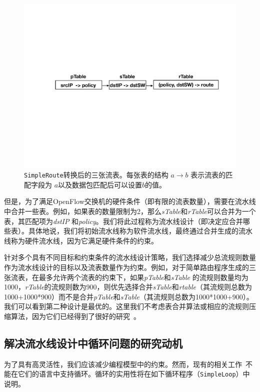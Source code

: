 \vspace{0.5cm}
\begin{figure}[!htbp]
\includegraphics[width=0.8\linewidth]{figures/lp-65.pdf}
\centering
\caption{\small \texttt{SimpleRoute}转换后的三张流表。每张表的结构 $a \rightarrow b$ 表示流表的匹配字段为 $a$以及数据包匹配后可以设置$b$的值。}
\label{fig:srp}
\end{figure}

但是，为了满足OpenFlow交换机的硬件条件（即有限的流表数量），需要在流水线中合并一些表。例如，如果表的数量限制为2，那么\emph{sTable}和\emph{rTable}可以合并为一个表，其匹配项为\emph{dstIP} 和\emph{policy}。我们将此过程称为流水线设计（即决定应合并哪些表）。具体地说，我们将初始流水线称为软件流水线，最终通过合并生成的流水线称为硬件流水线，因为它满足硬件条件的约束。

针对多个具有不同目标和约束条件的流水线设计策略，我们选择减少总流规则数量作为流水线设计的目标以及流表数量作为约束。例如，对于简单路由程序生成的三张流表，在最多允许两个流表的约束下，如果\emph{pTable}和\emph{sTable} 的流规则数量均为1000，\emph{rTable}的流规则数为900，则优先选择合并\emph{sTable}和\emph{rtable}（其流规则总数为1000+1000*900）而不是合并\emph{pTable}和\emph{sTable}（其流规则总数为1000*1000+900）。我们可以看到第二种设计是最优的。这里我们不考虑表合并算法或相应的流规则压缩算法，因为它们已经得到了很好的研究~\cite{ge2015h,gupta2001algorithms}。

\subsection{解决流水线设计中循环问题的研究动机}
为了具有高灵活性，我们应该减少编程模型中的约束。然而，现有的相关工作~\cite{snap,sivaraman2016packet}不能在它们的语言中支持循环。循环的实用性将在如下循环程序（\texttt{SimpleLoop}）中说明。

